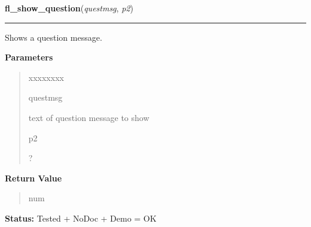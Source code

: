     \label{xformslib:library:fl_show_question}

    \vspace{0.5ex}

\hspace{.8\funcindent}\begin{boxedminipage}{\funcwidth}

    \raggedright \textbf{fl\_show\_question}(\textit{questmsg}, \textit{p2})

    \vspace{-1.5ex}

    \rule{\textwidth}{0.5\fboxrule}
\setlength{\parskip}{2ex}
    Shows a question message.

\setlength{\parskip}{1ex}
      \textbf{Parameters}
      \vspace{-1ex}

      \begin{quote}
        \begin{Ventry}{xxxxxxxx}

          \item[questmsg]

          text of question message to show

          \item[p2]

          ?

        \end{Ventry}

      \end{quote}

      \textbf{Return Value}
    \vspace{-1ex}

      \begin{quote}
      num

      \end{quote}

\textbf{Status:} Tested + NoDoc + Demo = OK



    \end{boxedminipage}

    \label{xformslib:library:fl_hide_question}

    \vspace{0.5ex}

